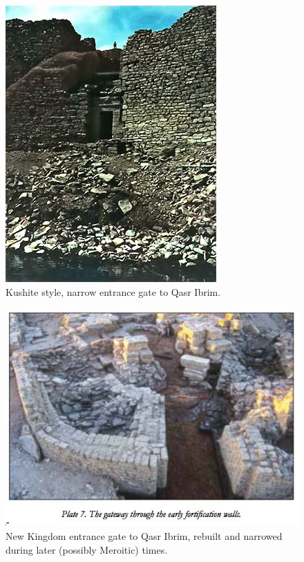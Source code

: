 \documentclass[a4paper,12pt]{scrreprt}
\begin{document}
\begin{figure}[H]
	\centering
	\includegraphics[width=\textwidth]{img/walls_gates/qasr_ibrim_gate}
	\caption{Kushite style, narrow entrance gate to Qasr Ibrim.}
\end{figure}

\begin{figure}[H]
	\centering
	\includegraphics[width=\textwidth]{img/walls_gates/new_kingdom_entrance_gate}
	\caption{New Kingdom entrance gate to Qasr Ibrim, rebuilt and narrowed during later (possibly Meroitic) times.}
\end{figure}
\end{document}
